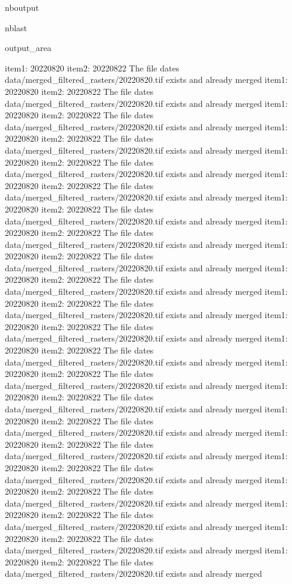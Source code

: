 \documentclass[letterpaper,10pt]{sphinxmanual}
\begin{document}
\begin{sphinxuseclass}{nboutput}
\begin{sphinxuseclass}{nblast}
{\begin{sphinxuseclass}{output_area}
\begin{sphinxuseclass}{}
\begin{sphinxVerbatim}[commandchars=\\\{\}]
item1:  20220820
item2:  20220822
The file dates data/merged\_filtered\_rasters/20220820.tif exists and already merged
item1:  20220820
item2:  20220822
The file dates data/merged\_filtered\_rasters/20220820.tif exists and already merged
item1:  20220820
item2:  20220822
The file dates data/merged\_filtered\_rasters/20220820.tif exists and already merged
item1:  20220820
item2:  20220822
The file dates data/merged\_filtered\_rasters/20220820.tif exists and already merged
item1:  20220820
item2:  20220822
The file dates data/merged\_filtered\_rasters/20220820.tif exists and already merged
item1:  20220820
item2:  20220822
The file dates data/merged\_filtered\_rasters/20220820.tif exists and already merged
item1:  20220820
item2:  20220822
The file dates data/merged\_filtered\_rasters/20220820.tif exists and already merged
item1:  20220820
item2:  20220822
The file dates data/merged\_filtered\_rasters/20220820.tif exists and already merged
item1:  20220820
item2:  20220822
The file dates data/merged\_filtered\_rasters/20220820.tif exists and already merged
item1:  20220820
item2:  20220822
The file dates data/merged\_filtered\_rasters/20220820.tif exists and already merged
item1:  20220820
item2:  20220822
The file dates data/merged\_filtered\_rasters/20220820.tif exists and already merged
item1:  20220820
item2:  20220822
The file dates data/merged\_filtered\_rasters/20220820.tif exists and already merged
item1:  20220820
item2:  20220822
The file dates data/merged\_filtered\_rasters/20220820.tif exists and already merged
item1:  20220820
item2:  20220822
The file dates data/merged\_filtered\_rasters/20220820.tif exists and already merged
item1:  20220820
item2:  20220822
The file dates data/merged\_filtered\_rasters/20220820.tif exists and already merged
item1:  20220820
item2:  20220822
The file dates data/merged\_filtered\_rasters/20220820.tif exists and already merged
item1:  20220820
item2:  20220822
The file dates data/merged\_filtered\_rasters/20220820.tif exists and already merged
item1:  20220820
item2:  20220822
The file dates data/merged\_filtered\_rasters/20220820.tif exists and already merged
item1:  20220820
item2:  20220822
The file dates data/merged\_filtered\_rasters/20220820.tif exists and already merged
item1:  20220820
item2:  20220822
The file dates data/merged\_filtered\_rasters/20220820.tif exists and already merged
item1:  20220820
item2:  20220822
The file dates data/merged\_filtered\_rasters/20220820.tif exists and already merged
item1:  20220820
item2:  20220822
The file dates data/merged\_filtered\_rasters/20220820.tif exists and already merged

\end{sphinxVerbatim}
\end{sphinxuseclass}
\end{sphinxuseclass}}
\end{sphinxuseclass}
\end{sphinxuseclass}
\end{document}
